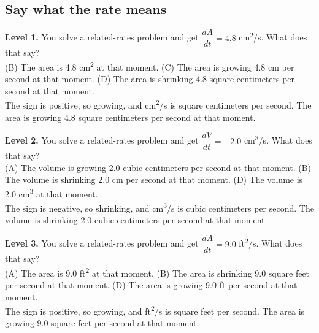 \documentclass[11pt]{article}
\begin{document}
\subsection*{Say what the rate means}
\noindent\textbf{Level 1.} You solve a related-rates problem and get $\dfrac{dA}{dt}=4.8$ cm\textsuperscript{2}/s. What does that say?\\  \quad (B) The area is 4.8 cm\textsuperscript{2} at that moment. \quad (C) The area is growing 4.8 cm per second at that moment. \quad (D) The area is shrinking 4.8 square centimeters per second at that moment.\\  \quad The sign is positive, so growing, and cm\textsuperscript{2}/s is square centimeters per second. The area is growing 4.8 square centimeters per second at that moment.\par\medskip
\noindent\textbf{Level 2.} You solve a related-rates problem and get $\dfrac{dV}{dt}=-2.0$ cm\textsuperscript{3}/s. What does that say?\\ (A) The volume is growing 2.0 cubic centimeters per second at that moment. \quad (B) The volume is shrinking 2.0 cm per second at that moment. \quad {} \quad (D) The volume is 2.0 cm\textsuperscript{3} at that moment.\\  \quad The sign is negative, so shrinking, and cm\textsuperscript{3}/s is cubic centimeters per second. The volume is shrinking 2.0 cubic centimeters per second at that moment.\par\medskip
\noindent\textbf{Level 3.} You solve a related-rates problem and get $\dfrac{dA}{dt}=9.0$ ft\textsuperscript{2}/s. What does that say?\\ (A) The area is 9.0 ft\textsuperscript{2} at that moment. \quad (B) The area is shrinking 9.0 square feet per second at that moment. \quad {} \quad (D) The area is growing 9.0 ft per second at that moment.\\  \quad The sign is positive, so growing, and ft\textsuperscript{2}/s is square feet per second. The area is growing 9.0 square feet per second at that moment.\par\medskip
\end{document}
